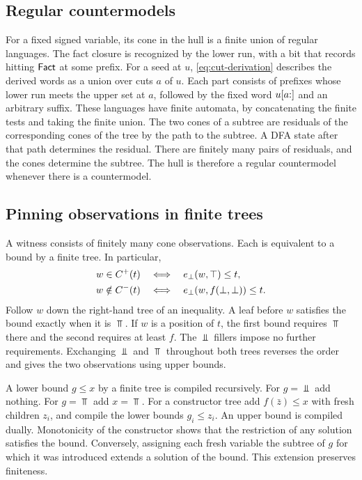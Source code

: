\subsection{Regular countermodels}

For a fixed signed variable, its cone in the hull is a finite union
of regular languages. The fact closure is recognized by the lower run,
with a bit that records hitting $\mathsf{Fact}$ at some prefix. For a seed at
$u$, \eqref{eq:cut-derivation} describes the derived words as a union
over cuts $a$ of $u$. Each part consists of prefixes whose lower run
meets the upper set at $a$, followed by the fixed word $u[a{:}]$
and an arbitrary suffix. These languages have finite automata, by
concatenating the finite tests and taking the finite union. The two
cones of a subtree are residuals of the corresponding cones of the
tree by the path to the subtree. A DFA state after that path determines
the residual. There are finitely many pairs of residuals, and the
cones determine the subtree. The hull is therefore a regular
countermodel whenever there is a countermodel.

\subsection{Pinning observations in finite trees}
\label{app:pinning}

A witness consists of finitely many cone observations. Each is
equivalent to a bound by a finite tree. In particular,
\begin{align*}
 w\in C^{+}(t)
     &\quad\Longleftrightarrow\quad e_\bot(w,\top)\le t,\\
 w\notin C^{-}(t)
     &\quad\Longleftrightarrow\quad e_\bot(w,f(\bot,\bot))\le t .
\end{align*}
Follow $w$ down the right-hand tree of an inequality. A leaf before
$w$ satisfies the bound exactly when it is $\Top$. If $w$ is a
position of $t$, the first bound requires $\Top$ there and the
second requires at least $f$. The $\Bot$ fillers impose no further
requirements. Exchanging $\Bot$ and $\Top$ throughout both trees
reverses the order and gives the two observations using upper bounds.

A lower bound $g\le x$ by a finite tree is compiled recursively.
For $g=\Bot$ add nothing. For $g=\Top$ add $x=\Top$. For a constructor
tree add $f(\bar z)\le x$ with fresh children $z_i$, and compile
the lower bounds $g_i\le z_i$. An upper bound is compiled dually.
Monotonicity of the constructor shows that the restriction of any
solution satisfies the bound. Conversely, assigning each fresh
variable the subtree of $g$ for which it was introduced extends
a solution of the bound. This extension preserves finiteness.

